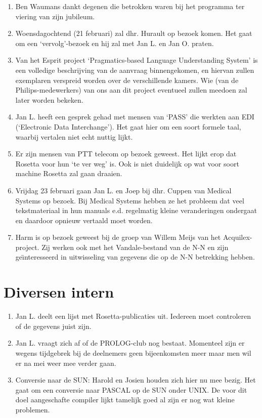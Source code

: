 \begin{enumerate}
    \item Ben Waumans dankt degenen die betrokken waren bij het programma ter 
          viering van zijn jubileum.
    \item Woensdagochtend (21 februari) zal dhr. Hurault op bezoek komen.
          Het gaat om een `vervolg'-bezoek en hij zal met Jan L. en Jan O.
          praten.
    \item Van het Esprit project `Pragmatics-based Language Understanding
          System' is een volledige beschrijving van de aanvraag binnengekomen,
          en hiervan zullen exemplaren verspreid worden over de verschillende 
          kamers. Wie (van de Philips-medewerkers) van ons aan dit project
          eventueel zullen meedoen zal later worden bekeken.
    \item Jan L. heeft een gesprek gehad met mensen van `PASS' die werkten
          aan EDI (`Electronic Data Interchange'). Het gaat hier om een soort
          formele taal, waarbij vertalen niet echt nuttig lijkt.
    \item Er zijn mensen van PTT telecom op bezoek geweest. Het lijkt erop dat 
          Rosetta voor hun `te ver weg' is. Ook is niet duidelijk op wat voor
          soort machine Rosetta zal gaan draaien.
    \item Vrijdag 23 februari gaan Jan L. en Joep bij dhr. Cuppen van Medical
          Systems op bezoek. Bij Medical Systems hebben ze het probleem dat
          veel tekstmateriaal in hun manuals e.d. regelmatig kleine 
          veranderingen ondergaat en daardoor opnieuw vertaald moet worden.
    \item Harm is op bezoek geweest bij de groep van Willem Meijs van het
          Acquilex-project. Zij werken ook met het Vandale-bestand van de N-N
          en zijn ge\"{\i}nteresseerd in uitwisseling van gegevens die op de N-N
          betrekking hebben.
\end{enumerate}

\section {Diversen intern}
\begin{enumerate}
    \item Jan L. deelt een lijst met Rosetta-publicaties uit. Iedereen moet
          controleren of de gegevens juist zijn.
    \item Jan L. vraagt zich af of de PROLOG-club nog bestaat. Momenteel zijn 
          er wegens tijdgebrek bij de deelnemers geen bijeenkomsten meer maar
          men wil er na mei weer mee verder gaan.
    \item Conversie naar de SUN: Harold en Josien houden zich hier nu mee
          bezig. Het gaat om een conversie naar PASCAL op de SUN onder UNIX.
          De voor dit doel aangeschafte compiler lijkt tamelijk goed al zijn er
          nog wat kleine problemen.
\end{enumerate}

